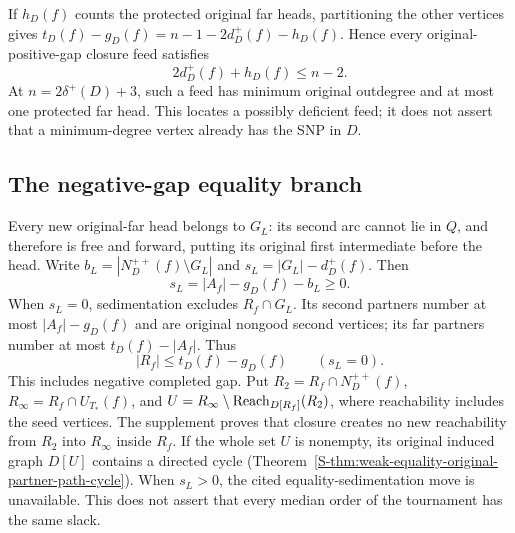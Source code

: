 If $h_D(f)$ counts the protected original far heads, partitioning the other
vertices gives $t_D(f)-g_D(f)=n-1-2d_D^+(f)-h_D(f)$. Hence every
original-positive-gap closure feed satisfies
\begin{equation}\label{eq:paper-degree-localization}
 2d_D^+(f)+h_D(f)\le n-2.
\end{equation}
At $n=2\delta^+(D)+3$, such a feed has minimum original outdegree and at
most one protected far head. This locates a possibly deficient feed; it
does not assert that a minimum-degree vertex already has the SNP in $D$.

\subsection{The negative-gap equality branch}
Every new original-far head belongs to $G_L$: its second arc cannot lie in
$Q$, and therefore is free and forward, putting its original first intermediate
before the head. Write
$b_L=|N_D^{++}(f)\setminus G_L|$ and
$s_L=|G_L|-d_D^+(f)$. Then
\begin{equation}\label{eq:paper-good-slack}
 s_L=|A_f|-g_D(f)-b_L\ge0.
\end{equation}
When $s_L=0$, sedimentation excludes $R_f\cap G_L$. Its second partners
number at most $|A_f|-g_D(f)$ and are original nongood second vertices;
its far partners number at most $t_D(f)-|A_f|$. Thus
\begin{equation}\label{eq:paper-equality-partners}
 |R_f|\le t_D(f)-g_D(f)\qquad(s_L=0).
\end{equation}
This includes negative completed gap. Put
$R_2=R_f\cap N_D^{++}(f)$, $R_\infty=R_f\cap U_{T_*}(f)$, and
$U=R_\infty\setminus\operatorname{Reach}_{D[R_f]}(R_2)$, where reachability includes
the seed vertices. The supplement proves that closure creates no new
reachability from $R_2$ into $R_\infty$ inside $R_f$. If the whole set $U$
is nonempty, its original induced graph $D[U]$ contains a directed cycle
(Theorem~\ref{S-thm:weak-equality-original-partner-path-cycle}).
When $s_L>0$, the cited equality-sedimentation move is unavailable. This
does not assert that every median order of the tournament has the same slack.
